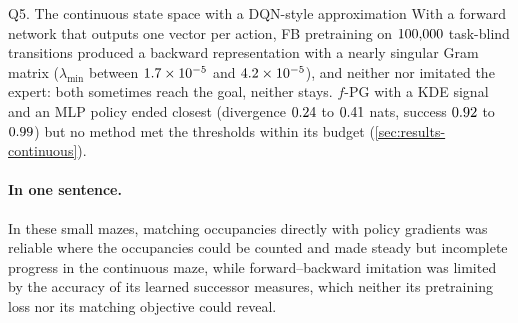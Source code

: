 \begin{answerbox}{Q5. The continuous state space with a DQN-style approximation}
With a forward network that outputs one vector per action, FB pretraining on $\vn{replay.c}{100{,}000}$ task-blind transitions produced a backward representation with a nearly singular Gram matrix ($\lambda_{\min}$ between $\vn{s12.lmin.lo}{1.7\times10^{-5}}$ and $\vn{s12.lmin.hi}{4.2\times10^{-5}}$), and neither \ERFB{} nor \DMFB{} imitated the expert: both sometimes reach the goal, neither stays. $f$-PG with a KDE signal and an MLP policy ended closest (divergence $\vn{abs.cont.fpg.js.lo}{0.24}$ to $\vn{abs.cont.fpg.js.hi}{0.41}$ nats, success $\vn{abs.cont.fpg.succ.lo}{0.92}$ to $\vn{abs.cont.fpg.succ.hi}{0.99}$) but no method met the thresholds within its budget (\cref{sec:results-continuous}).
\end{answerbox}

\paragraph{In one sentence.}
In these small mazes, matching occupancies directly with policy gradients was reliable where the occupancies could be counted and made steady but incomplete progress in the continuous maze, while forward--backward imitation was limited by the accuracy of its learned successor measures, which neither its pretraining loss nor its matching objective could reveal.
